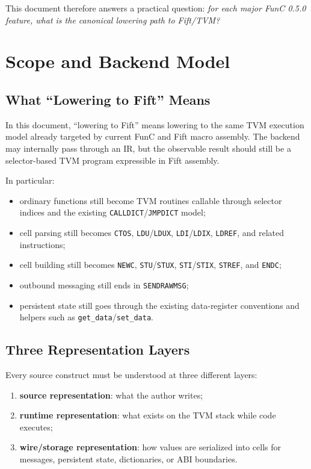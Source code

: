 \documentclass[12pt,oneside]{article}
\begin{document}
This document therefore answers a practical question: \emph{for each major
FunC 0.5.0 feature, what is the canonical lowering path to Fift/TVM?}

\clearpage
\tableofcontents

\clearpage
\section{Scope and Backend Model}
\subsection{What ``Lowering to Fift'' Means}
In this document, ``lowering to Fift'' means lowering to the same TVM execution
model already targeted by current FunC and Fift macro assembly. The backend may
internally pass through an IR, but the observable result should still be a
selector-based TVM program expressible in Fift assembly.

In particular:

\begin{itemize}
\item ordinary functions still become TVM routines callable through selector
indices and the existing \verb|CALLDICT|/\verb|JMPDICT| model;
\item cell parsing still becomes \verb|CTOS|, \verb|LDU|/\verb|LDUX|,
\verb|LDI|/\verb|LDIX|, \verb|LDREF|, and related instructions;
\item cell building still becomes \verb|NEWC|, \verb|STU|/\verb|STUX|,
\verb|STI|/\verb|STIX|, \verb|STREF|, and \verb|ENDC|;
\item outbound messaging still ends in \verb|SENDRAWMSG|;
\item persistent state still goes through the existing data-register
conventions and helpers such as \verb|get_data|/\verb|set_data|.
\end{itemize}

\subsection{Three Representation Layers}
Every source construct must be understood at three different layers:

\begin{enumerate}
\item \textbf{source representation}: what the author writes;
\item \textbf{runtime representation}: what exists on the TVM stack while code
executes;
\item \textbf{wire/storage representation}: how values are serialized into
cells for messages, persistent state, dictionaries, or ABI boundaries.
\end{enumerate}
\end{document}
